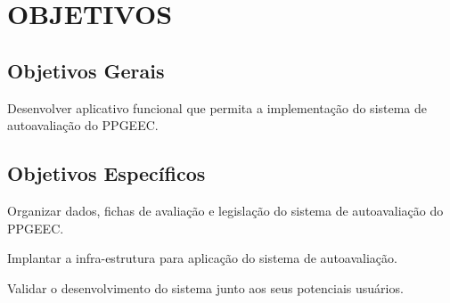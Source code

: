 \chapter{OBJETIVOS}
\label{cap:objetivos}

    \section{Objetivos Gerais}
    \label{sec:objetivos-gerais}

       Desenvolver aplicativo funcional que permita a implementação do sistema de autoavaliação do \gls{PPGEEC}.
    \section{Objetivos Específicos}
    \label{sec:objetivos-especificos}
       \begin{alineascomponto}
        	\item Organizar dados, fichas de avaliação e legislação do sistema de autoavaliação do \gls{PPGEEC}.
        	\item Implantar a infra-estrutura para aplicação do sistema de autoavaliação.
        	\item Validar o desenvolvimento do sistema junto aos seus potenciais usuários.
        \end{alineascomponto}
        
        
        
        

    
    
